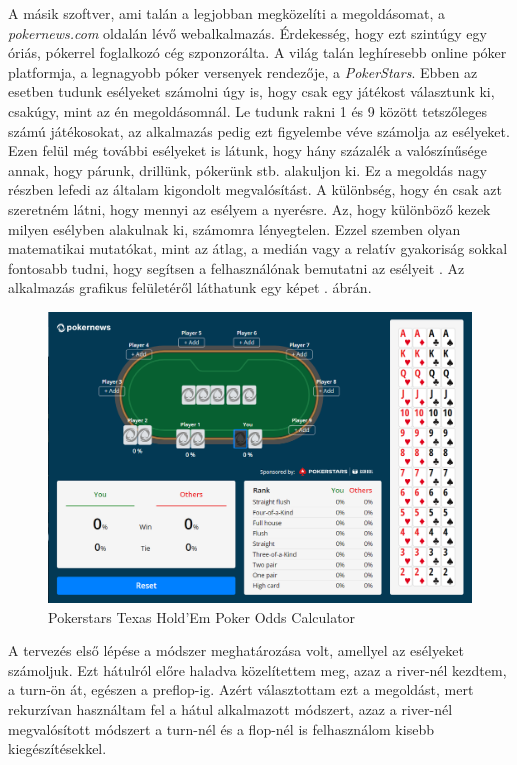 A másik szoftver, ami talán a legjobban megközelíti a megoldásomat, a \textit{pokernews.com} oldalán lévő webalkalmazás. Érdekesség, hogy ezt szintúgy egy óriás, pókerrel foglalkozó cég szponzorálta. A világ talán leghíresebb online póker platformja, a legnagyobb póker versenyek rendezője, a \textit{PokerStars}. Ebben az esetben tudunk esélyeket számolni úgy is, hogy csak egy játékost választunk ki, csakúgy, mint az én megoldásomnál. Le tudunk rakni 1 és 9 között tetszőleges számú játékosokat, az alkalmazás pedig ezt figyelembe véve számolja az esélyeket. Ezen felül még további esélyeket is látunk, hogy hány százalék a valószínűsége annak, hogy párunk, drillünk, pókerünk stb. alakuljon ki. Ez a megoldás nagy részben lefedi az általam kigondolt megvalósítást. A különbség, hogy én csak azt szeretném látni, hogy mennyi az esélyem a nyerésre. Az, hogy különböző kezek milyen esélyben alakulnak ki, számomra lényegtelen. Ezzel szemben olyan matematikai mutatókat, mint az átlag, a medián vagy a relatív gyakoriság sokkal fontosabb tudni, hogy segítsen a felhasználónak bemutatni az esélyeit \cite{harrington}. Az alkalmazás grafikus felületéről láthatunk egy képet . ábrán.

\begin{figure}[h!]
\centering
\includegraphics[width=\textwidth]{images/pokerstars.png}
\caption{Pokerstars Texas Hold'Em Poker Odds Calculator \cite{pokerstars}}
\label{fig:pokerstars}
\end{figure}


A tervezés első lépése a módszer meghatározása volt, amellyel az esélyeket számoljuk. Ezt hátulról előre haladva közelítettem meg, azaz a river-nél kezdtem, a turn-ön át, egészen a preflop-ig. Azért választottam ezt a megoldást, mert rekurzívan használtam fel a hátul alkalmazott módszert, azaz a river-nél megvalósított módszert a turn-nél és a flop-nél is felhasználom kisebb kiegészítésekkel.

